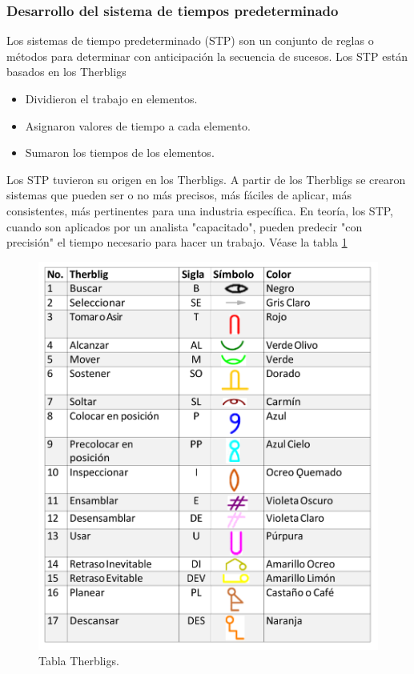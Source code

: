     \subsubsection{Desarrollo del sistema de tiempos predeterminado}
    
    Los sistemas de tiempo predeterminado (STP) son un conjunto de reglas o métodos para determinar con anticipación la secuencia de sucesos.
    Los STP están basados en los Therbligs
    \begin{itemize}
    \item Dividieron el trabajo en elementos.
    \item Asignaron valores de tiempo a cada elemento.
    \item Sumaron los tiempos de los elementos. 
    \end{itemize}
    Los STP tuvieron su origen en los Therbligs. A partir de los Therbligs se crearon sistemas que pueden ser o no más precisos, más fáciles de aplicar, más consistentes, más pertinentes para una industria específica. En teoría, los STP, cuando son aplicados por un analista "capacitado", pueden predecir "con precisión" el tiempo necesario para hacer un trabajo. Véase la tabla \ref{fig:tablaTherbligs}
    \begin{figure}[H]
        \centering
        \includegraphics[scale=0.25]{3/Img/tablaTherblig.pdf}
        \caption{Tabla Therbligs.}
        \label{fig:tablaTherbligs}
    \end{figure}
